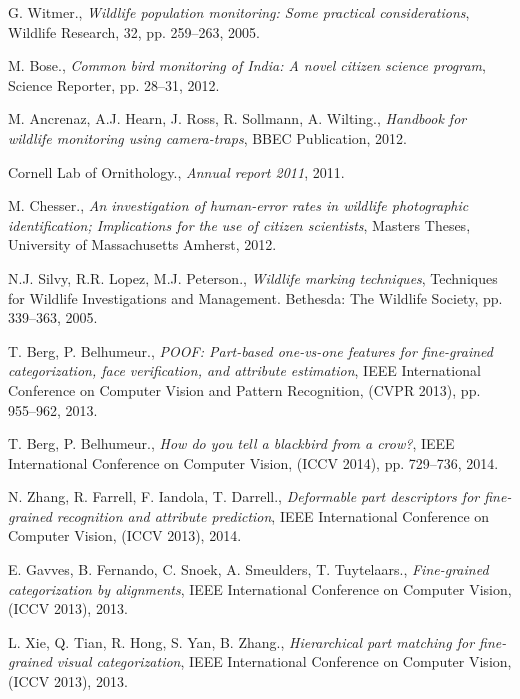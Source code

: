 \documentclass{article}
\begin{document}
\begin{thebibliography}{100}


G. Witmer., \emph{Wildlife population monitoring: Some practical considerations}, Wildlife Research, 32, pp. 259--263, 2005. 

M. Bose., \emph{Common bird monitoring of India: A novel citizen science program}, Science Reporter, pp. 28--31, 2012. 

M. Ancrenaz, A.J. Hearn, J. Ross, R. Sollmann, A. Wilting., \emph{Handbook for wildlife monitoring using camera-traps}, BBEC Publication, 2012. 

Cornell Lab of Ornithology., \emph{Annual report 2011}, 2011. 

M. Chesser., \emph{An investigation of human-error rates in wildlife photographic identification; Implications for the use of citizen scientists}, Masters Theses, University of Massachusetts Amherst, 2012. 

N.J. Silvy, R.R. Lopez, M.J. Peterson., \emph{Wildlife marking techniques}, Techniques for Wildlife Investigations and Management. Bethesda: The Wildlife Society, pp. 339--363, 2005. 

T. Berg, P. Belhumeur., \emph{POOF: Part-based one-vs-one features for fine-grained categorization, face verification, and attribute estimation}, IEEE International Conference on Computer Vision and Pattern Recognition, (CVPR 2013), pp. 955--962, 2013. 

T. Berg, P. Belhumeur., \emph{How do you tell a blackbird from a crow?}, IEEE International Conference on Computer Vision, (ICCV 2014), pp. 729--736, 2014. 

N. Zhang, R. Farrell, F. Iandola, T. Darrell., \emph{Deformable part descriptors for fine-grained recognition and attribute prediction}, IEEE International Conference on Computer Vision, (ICCV 2013), 2014. 

E. Gavves, B. Fernando, C. Snoek, A. Smeulders, T. Tuytelaars., \emph{Fine-grained categorization by alignments}, IEEE International Conference on Computer Vision, (ICCV 2013), 2013. 

L. Xie, Q. Tian, R. Hong, S. Yan, B. Zhang., \emph{Hierarchical part matching for fine-grained visual categorization}, IEEE International Conference on Computer Vision, (ICCV 2013), 2013. 


\end{thebibliography}
\end{document}
